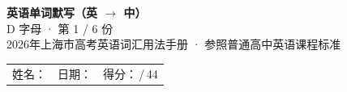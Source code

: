 \documentclass[10pt,a4paper]{article}
\begin{document}
\pagestyle{plain}

\begin{center}
{\LARGE\bfseries 英语单词默写（英 $\to$ 中）}\\[0.22em]
{\large D 字母 · 第 1 / 6 份}\\[0.18em]
{\small 2026年上海市高考英语词汇用法手册 · 参照普通高中英语课程标准}
\end{center}

\vspace{0.25em}
\noindent\begin{tabular}{@{}p{}@{}p{}@{}p{}@{}}
姓名：\underline{\hspace{2.0cm}} & 日期：\underline{\hspace{2.0cm}} & 得分：\underline{\hspace{1.3cm}}\,/\,44 \\
\end{tabular}

\vspace{0.3em}

\vspace{0.08em}
\end{document}
